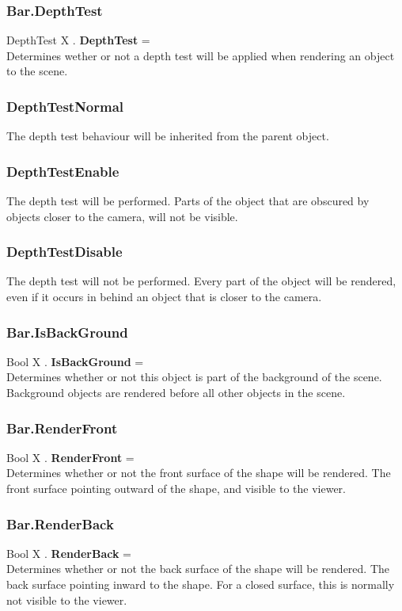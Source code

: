 \documentclass[10pt]{book}
\begin{document}
\subsubsection{Bar.DepthTest \label{F:Bar:DepthTest}}
DepthTest X . \textbf{DepthTest} = \\
Determines wether or not a depth test will be applied when rendering an object to the scene.

\subsubsection{DepthTestNormal \label{T:DepthTest|DepthTestNormal}}
The depth test behaviour will be inherited from the parent object.

\subsubsection{DepthTestEnable \label{T:DepthTest|DepthTestEnable}}
The depth test will be performed. Parts of the object that are obscured by objects closer to the camera, will not be visible.

\subsubsection{DepthTestDisable \label{T:DepthTest|DepthTestDisable}}
The depth test will not be performed. Every part of the object will be rendered, even if it occurs in behind an object that is closer to the camera.

\subsubsection{Bar.IsBackGround \label{F:Bar:IsBackGround}}
Bool X . \textbf{IsBackGround} = \\
Determines whether or not this object is part of the background of the scene. Background objects are rendered before all other objects in the scene.

\subsubsection{Bar.RenderFront \label{F:Bar:RenderFront}}
Bool X . \textbf{RenderFront} = \\
Determines whether or not the front surface of the shape will be rendered. The front surface pointing outward of the shape, and visible to the viewer.

\subsubsection{Bar.RenderBack \label{F:Bar:RenderBack}}
Bool X . \textbf{RenderBack} = \\
Determines whether or not the back surface of the shape will be rendered. The back surface pointing inward to the shape. For a closed surface, this is normally not visible to the viewer.
\end{document}
